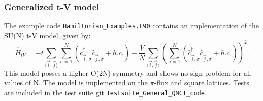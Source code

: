 \subsubsection{ Generalized t-V model }

The example code \texttt{Hamiltonian\_Examples.F90}   contains  an implementation of the SU(N)  t-V model, given by: 
\begin{equation}
	  \hat{H}_{tV} =   
	   -  t  \sum_{\langle \vec{i}, \vec{j} \rangle}   \sum_{\sigma =1}^{N} 
	  \left( \hat{c}^{\dagger}_{\vec{i},\sigma} \hat{c}^{\phantom{\dagger}}_{\vec{j},\sigma}    + h.c. \right)    -\frac{V}{N}  \sum_{\langle \vec{i}, \vec{j} \rangle} 
	   \left( \sum_{\sigma =1}^{N} 
	  \left( \hat{c}^{\dagger}_{\vec{i},\sigma} \hat{c}^{\phantom{\dagger}}_{\vec{j},\sigma}    + h.c. \right)  \right)^2. 
\end{equation}
This model  posses a higher O(2N) symmetry and shows no sign problem  for all values of N.   The model  is implemented on the $\pi$-flux and  square lattices. Tests are included in the test suite git \texttt{Testsuite\_General\_QMCT\_code}.


